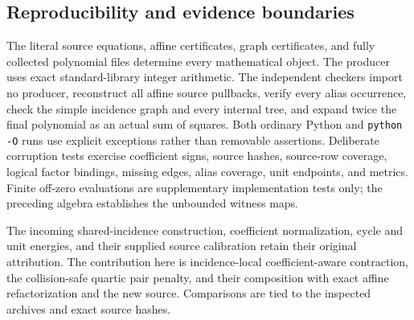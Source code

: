 \subsection{Reproducibility and evidence boundaries}
The literal source equations, affine certificates, graph certificates,
and fully collected polynomial files determine every mathematical object.
The producer uses exact standard-library integer arithmetic. The independent
checkers import no producer, reconstruct all affine source pullbacks,
verify every alias occurrence, check the simple incidence graph and every
internal tree, and expand twice the final polynomial as an actual sum of
squares. Both ordinary Python and \texttt{python -O} runs use explicit
exceptions rather than removable assertions. Deliberate corruption tests
exercise coefficient signs, source hashes, source-row coverage, logical
factor bindings, missing edges, alias coverage, unit endpoints, and metrics.
Finite off-zero evaluations are supplementary implementation tests only;
the preceding algebra establishes the unbounded witness maps.

The incoming shared-incidence construction, coefficient normalization,
cycle and unit energies, and their supplied source calibration retain
their original attribution. The contribution here is incidence-local
coefficient-aware contraction, the collision-safe quartic pair penalty,
and their composition with exact affine refactorization and the new source.
Comparisons are tied to the inspected archives and exact source hashes.
